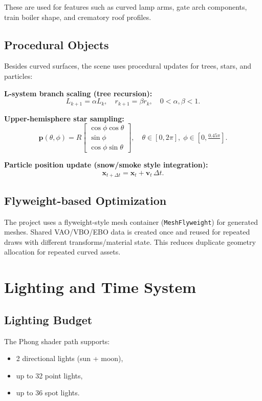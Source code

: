 \documentclass{article}
\begin{document}
These are used for features such as curved lamp arms, gate arch components, train boiler shape, and crematory roof profiles.

\subsection{Procedural Objects}
Besides curved surfaces, the scene uses procedural updates for trees, stars, and particles:

\textbf{L-system branch scaling (tree recursion):}
\begin{equation}
L_{k+1} = \alpha L_k, \quad r_{k+1} = \beta r_k, \quad 0<\alpha,\beta<1.
\end{equation}

\textbf{Upper-hemisphere star sampling:}
\begin{equation}
\mathbf{p}(\theta,\phi)=R\begin{bmatrix}
\cos\phi\cos\theta \\
\sin\phi \\
\cos\phi\sin\theta
\end{bmatrix},
\quad \theta\in[0,2\pi],\;\phi\in\left[0,\tfrac{0.45\pi}{ }\right].
\end{equation}

\textbf{Particle position update (snow/smoke style integration):}
\begin{equation}
\mathbf{x}_{t+\Delta t}=\mathbf{x}_t+\mathbf{v}_t\,\Delta t.
\end{equation}

\subsection{Flyweight-based Optimization}
The project uses a flyweight-style mesh container (\texttt{MeshFlyweight}) for generated meshes. Shared VAO/VBO/EBO data is created once and reused for repeated draws with different transforms/material state. This reduces duplicate geometry allocation for repeated curved assets.

\section{Lighting and Time System}
\subsection{Lighting Budget}
The Phong shader path supports:
\begin{itemize}
    \item 2 directional lights (sun + moon),
    \item up to 32 point lights,
    \item up to 36 spot lights.
\end{itemize}
\end{document}
